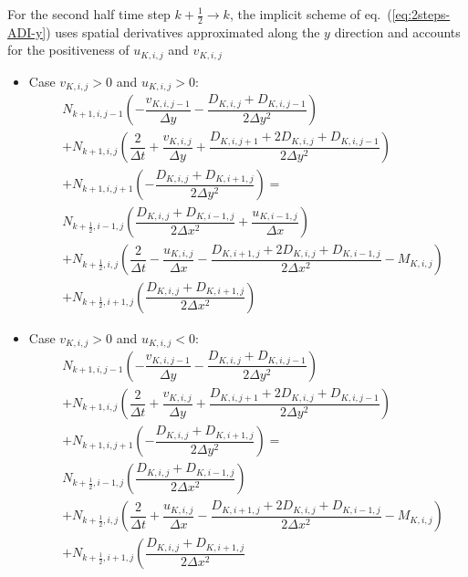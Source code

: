 For the second half time step $k+\frac{1}{2} \to k $, the implicit scheme of eq.~(\ref{eq:2steps-ADI-y}) uses spatial derivatives approximated along the $y$ direction and accounts for the positiveness of $u_{K,i,j}$
and $v_{K,i,j}$
\begin{itemize}
\item Case $v_{K,i,j}>0$ and $u_{K,i,j}>0$:
\begin{align}
  \label{eq:2steps-ADI-y-vpos-upos}
  \nonumber
  &N_{k+1,i,j-1}  \left(
    -\dfrac{v_{K,i,j-1}}{\Delta y}
    -\dfrac{D_{K,i,j}+D_{K,i,j-1}}{2\Delta y^2}
  \right) 
  \\\nonumber
  &+ N_{k+1,i,j}  \left(
    \dfrac{2}{\Delta t} 
    +\dfrac{v_{K,i,j}}{\Delta y}
    +\dfrac{D_{K,i,j+1}+2D_{K,i,j}+D_{K,i,j-1}}{2\Delta y^2}\right) 
  \\\nonumber
  & + N_{k+1,i,j+1} \left(
    -\dfrac{D_{K,i,j}+D_{K,i+1,j}}{2\Delta y^2}
  \right) = 
  \\
  \nonumber
  &N_{k+\frac{1}{2},i-1,j}\left(\dfrac{D_{K,i,j}+D_{K,i-1,j}}{2\Delta x^2}
    +\dfrac{u_{K,i-1,j}}{\Delta x}\right)
  \\\nonumber
  &+ N_{k+\frac{1}{2},i,j}\left(\dfrac{2}{\Delta t}-\dfrac{u_{K,i,j}}{\Delta x}
    -\dfrac{D_{K,i+1,j}+2D_{K,i,j}+D_{K,i-1,j}}{2\Delta x^2}- M_{K,i,j} \right)\\
  &+N_{k+\frac{1}{2},i+1,j}\left(\dfrac{D_{K,i,j}+D_{K,i+1,j}}{2\Delta x^2}\right)
\end{align}
\item Case $v_{K,i,j}>0$ and $u_{K,i,j}<0$:
 \begin{align}
   \label{eq:2steps-ADI-y-vpos-uneg}
    \nonumber
  &N_{k+1,i,j-1}  \left(
    -\dfrac{v_{K,i,j-1}}{\Delta y}
    -\dfrac{D_{K,i,j}+D_{K,i,j-1}}{2\Delta y^2}
  \right) 
  \\\nonumber
  &+ N_{k+1,i,j}  \left(
    \dfrac{2}{\Delta t} 
    +\dfrac{v_{K,i,j}}{\Delta y}
    +\dfrac{D_{K,i,j+1}+2D_{K,i,j}+D_{K,i,j-1}}{2\Delta y^2}\right) 
  \\\nonumber
  & + N_{k+1,i,j+1} \left(
    -\dfrac{D_{K,i,j}+D_{K,i+1,j}}{2\Delta y^2}
  \right) = 
  \\
  \nonumber
  &N_{k+\frac{1}{2},i-1,j}\left(\dfrac{D_{K,i,j}+D_{K,i-1,j}}{2\Delta x^2}\right)
  \\\nonumber
  &+ N_{k+\frac{1}{2},i,j}\left(\dfrac{2}{\Delta t}+\dfrac{u_{K,i,j}}{\Delta x}
    -\dfrac{D_{K,i+1,j}+2D_{K,i,j}+D_{K,i-1,j}}{2\Delta x^2}- M_{K,i,j} \right)\\
  &+N_{k+\frac{1}{2},i+1,j}\left(\dfrac{D_{K,i,j}+D_{K,i+1,j}}{2\Delta x^2}

\end{align}
\end{itemize}
